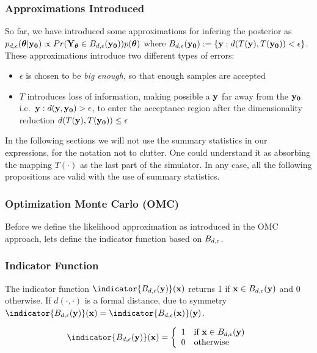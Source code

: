 \subsubsection{Approximations Introduced}

So far, we have introduced some approximations for infering the
posterior as
$p_{d,\epsilon}(\boldsymbol{\theta}|\mathbf{y_0}) \propto Pr(\mathbf{Y}_{\boldsymbol{\theta}} \in
B_{d,\epsilon}(\mathbf{y_0}))p(\boldsymbol{\theta})$ where
$B_{d,\epsilon}(\mathbf{y_0}) := \{\mathbf{y}: d(T(\mathbf{y}), T(\mathbf{y_0})) < \epsilon \}$. These
approximations introduce two different types of errors:

\begin{itemize}
\item $\epsilon$ is chosen to be \textit{big enough}, so that enough
  samples are accepted
\item $T$ introduces loss of information, making possible a $\mathbf{y}$ far
  away from the $\mathbf{y_0}$ i.e.\ $\mathbf{y}: d(\mathbf{y},\mathbf{y_0})>\epsilon$, to enter
  the acceptance region after the dimensionality reduction
  $d(T(\mathbf{y}), T(\mathbf{y_0})) \leq \epsilon$
\end{itemize}

\noindent
In the following sections we will not use the summary statistics in
our expressions, for the notation not to clutter. One could understand
it as absorbing the mapping $T(\cdot)$ as the last part of the
simulator. In any case, all the following propositions are valid with
the use of summary statistics.
  
\subsubsection{Optimization Monte Carlo (OMC)}

Before we define the likelihood approximation as introduced in the OMC
approach, lets define the indicator function based on $B_{d,\epsilon}$.

\subsubsection*{Indicator Function}

The indicator function $\indicator{\region(\yb)}(\xb)$ returns 1 if
$\mathbf{x} \in B_{d,\epsilon}(\mathbf{y})$ and 0 otherwise. If $d(\cdot,\cdot)$ is a
formal distance, due to symmetry
$\indicator{\region(\yb)}(\xb) = \indicator{\region(\xb)}(\yb)$.

\begin{gather} \label{eq:indicator} \indicator{\region(\yb)}(\xb)=
  \left\{
    \begin{array}{ll}
      1 & \mbox{if } \xb \in \region(\yb) \\
      0 & \mbox{otherwise} 
    \end{array} \right. \end{gather}

